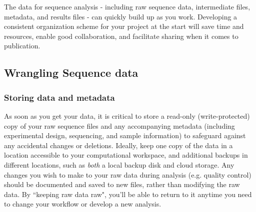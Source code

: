 \documentclass[10pt,letterpaper]{article}
\begin{document}
The data for sequence analysis - including raw sequence data, intermediate files, metadata, and results files - can quickly build up as you work. Developing a consistent organization scheme for your project at the start will save time and resources, enable good collaboration, and facilitate sharing when it comes to publication. 

\subsection*{Wrangling Sequence data}



\subsubsection*{Storing data and metadata} %

As soon as you get your data, it is critical to store a read-only (write-protected) copy of your raw sequence files and any accompanying metadata (including experimental design, sequencing, and sample information) to safeguard against any accidental changes or deletions.
Ideally, keep one copy of the data in a location accessible to your computational workspace, and additional backups in different locations, such as \textit{both} a local backup disk and cloud storage.
Any changes you wish to make to your raw data during analysis (e.g. quality control) should be documented and saved to new files, rather than modifying the raw data. 
By ``keeping raw data raw", you'll be able to return to it anytime you need to change your workflow or develop a new analysis. 
\end{document}
